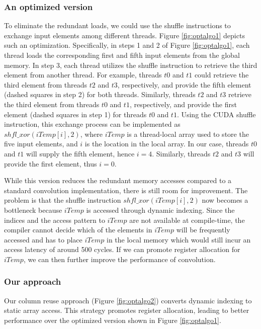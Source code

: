 \subsubsection{An optimized version} To eliminate the redundant loads, we could use the shuffle instructions to exchange input elements among
different threads.   
Figure \ref{fig:optalgo1} depicts such an optimization. 
Specifically, in steps 1 and 2 of Figure \ref{fig:optalgo1}, each thread loads the corresponding first and fifth input elements from the global memory. 
In step 3, each thread utilizes the shuffle instruction to retrieve the third element from another thread. 
For example, threads $t0$ and $t1$ could retrieve the third element from threads $t2$ and $t3$, respectively, and provide the fifth element (dashed squares in step 2) for both threads. 
Similarly, threads $t2$ and $t3$ retrieve the third element from threads $t0$ and $t1$, respectively, and provide the first element (dashed squares in step 1) for threads $t0$ and $t1$. 
Using the CUDA shuffle instruction, this exchange process can be implemented as $shfl\_xor(iTemp[i],2)$, where $iTemp$ is a thread-local array used to store the five input elements, and $i$ is the location in the local array. 
In our case, threads $t0$ and $t1$ will supply the fifth element, hence $i=4$. 
Similarly, threads $t2$ and $t3$ will provide the first element, thus $i=0$.

While this version reduces the redundant memory accesses compared to a standard convolution implementation, there is still room for improvement. 
The problem is that the shuffle instruction $shfl\_xor(iTemp[i],2)$ now becomes a bottleneck because $iTemp$ is accessed through dynamic indexing. 
Since the indices and the access pattern to $iTemp$ are not available at compile-time, the compiler cannot decide which of the elements in $iTemp$ will be frequently accessed and has to place $iTemp$ in the local memory which would still incur an access latency of around 500 cycles. 
If we can promote register allocation for $iTemp$, we can then further improve the performance of convolution.

\subsubsection{Our approach}
Our column reuse approach (Figure \ref {fig:optalgo2}) converts dynamic indexing to static array access. 
This strategy promotes register allocation, leading to better performance over the optimized version shown in Figure \ref{fig:optalgo1}.

